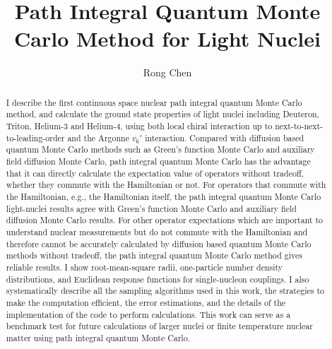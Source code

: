 \documentclass[12pt,letterpaper,UTF8]{report}
\title{Path Integral Quantum Monte Carlo Method for Light Nuclei}
\author{Rong Chen}
\begin{document}
\maketitle

\begin{abstract}\hypertarget{abshyper}{}I describe the first continuous space nuclear path integral quantum Monte Carlo method, and calculate the ground state properties of light nuclei including Deuteron, Triton, Helium-3 and Helium-4, using both local chiral interaction up to next-to-next-to-leading-order and the Argonne $v_6'$ interaction.
Compared with diffusion based quantum Monte Carlo methods such as Green's function Monte Carlo and auxiliary field diffusion Monte Carlo, path integral quantum Monte Carlo has the advantage that it can directly calculate the expectation value of operators without tradeoff, whether they commute with the Hamiltonian or not.
For operators that commute with the Hamiltonian, e.g., the Hamiltonian itself, the path integral quantum Monte Carlo light-nuclei results agree with Green's function Monte Carlo and auxiliary field diffusion Monte Carlo results.
For other operator expectations which are important to understand nuclear measurements but do not commute with the Hamiltonian and therefore cannot be accurately calculated by diffusion based quantum Monte Carlo methods without tradeoff, the path integral quantum Monte Carlo method gives reliable results.
I show root-mean-square radii, one-particle number density distributions, and Euclidean response functions for single-nucleon couplings.
I also systematically describe all the sampling algorithms used in this work,
the strategies to make the computation efficient,  the error estimations, and the details of the implementation of the code to perform calculations.
This work can serve as a benchmark test for future calculations of larger nuclei or finite temperature nuclear matter using path integral quantum Monte Carlo.
\end{abstract}

\end{document}
